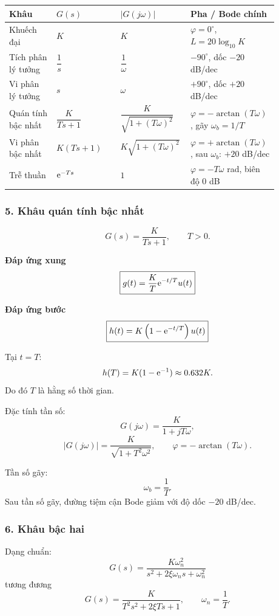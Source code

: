 \begin{center}
\begin{tabular}{|p{0.17\linewidth}|p{0.23\linewidth}|p{0.23\linewidth}|p{0.25\linewidth}|}
\hline
\textbf{Khâu} & \textbf{$G(s)$} & \textbf{$|G(j\omega)|$} & \textbf{Pha / Bode chính} \\ \hline
Khuếch đại & $K$ & $K$ & $\varphi=0^\circ$, $L=20\log_{10}K$ \\ \hline
Tích phân lý tưởng & $\dfrac{1}{s}$ & $\dfrac{1}{\omega}$ & $-90^\circ$, dốc $-20$ dB/dec \\ \hline
Vi phân lý tưởng & $s$ & $\omega$ & $+90^\circ$, dốc $+20$ dB/dec \\ \hline
Quán tính bậc nhất & $\dfrac{K}{Ts+1}$ & $\dfrac{K}{\sqrt{1+(T\omega)^2}}$ &
$\varphi=-\arctan(T\omega)$, gãy $\omega_b=1/T$ \\ \hline
Vi phân bậc nhất & $K(Ts+1)$ & $K\sqrt{1+(T\omega)^2}$ &
$\varphi=+\arctan(T\omega)$, sau $\omega_b$: $+20$ dB/dec \\ \hline
Trễ thuần & $\mathrm{e}^{-Ts}$ & $1$ & $\varphi=-T\omega$ rad, biên độ $0$ dB \\ \hline
\end{tabular}
\end{center}

\subsubsection*{5. Khâu quán tính bậc nhất}

\[
\boxed{
G(s)=\frac{K}{Ts+1},\qquad T>0.
}
\]

\textbf{Đáp ứng xung}
\[
\boxed{
g(t)=\frac{K}{T}\mathrm{e}^{-t/T}u(t)
}
\]

\textbf{Đáp ứng bước}
\[
\boxed{
h(t)=K\left(1-\mathrm{e}^{-t/T}\right)u(t)
}
\]

Tại $t=T$:
\[
h(T)=K(1-\mathrm{e}^{-1})\approx0.632K.
\]
Do đó $T$ là hằng số thời gian.

Đặc tính tần số:
\[
G(j\omega)=\frac{K}{1+jT\omega},
\]
\[
|G(j\omega)|=\frac{K}{\sqrt{1+T^2\omega^2}},
\qquad
\varphi=-\arctan(T\omega).
\]

Tần số gãy:
\[
\boxed{
\omega_b=\frac1T.
}
\]
Sau tần số gãy, đường tiệm cận Bode giảm với độ dốc $-20$ dB/dec.

\subsubsection*{6. Khâu bậc hai}

Dạng chuẩn:
\[
\boxed{
G(s)=
\frac{K\omega_n^2}
{s^2+2\xi\omega_ns+\omega_n^2}
}
\]
tương đương
\[
G(s)=\frac{K}{T^2s^2+2\xi Ts+1},
\qquad \omega_n=\frac1T.
\]


